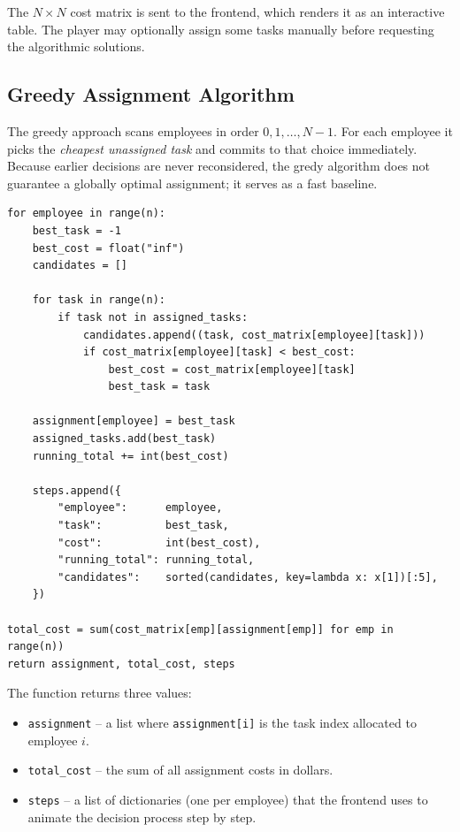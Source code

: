\documentclass[12pt,a4paper]{article}
\begin{document}
\noindent
The $N \times N$ cost matrix is sent to the frontend, which renders it as an
interactive table. The player may optionally assign some tasks manually before
requesting the algorithmic solutions.

\subsection{Greedy Assignment Algorithm}

The greedy approach scans employees in order $0, 1, \ldots, N-1$. For each employee
it picks the \emph{cheapest unassigned task} and commits to that choice immediately.
Because earlier decisions are never reconsidered, the gredy algorithm does not
guarantee a globally optimal assignment; it serves as a fast baseline.

\needspace{14cm}
\begin{lstlisting}[caption={Greedy core loop -- backend/algorithms/greedy.py}]
for employee in range(n):
    best_task = -1
    best_cost = float("inf")
    candidates = []

    for task in range(n):
        if task not in assigned_tasks:
            candidates.append((task, cost_matrix[employee][task]))
            if cost_matrix[employee][task] < best_cost:
                best_cost = cost_matrix[employee][task]
                best_task = task

    assignment[employee] = best_task
    assigned_tasks.add(best_task)
    running_total += int(best_cost)

    steps.append({
        "employee":      employee,
        "task":          best_task,
        "cost":          int(best_cost),
        "running_total": running_total,
        "candidates":    sorted(candidates, key=lambda x: x[1])[:5],
    })

total_cost = sum(cost_matrix[emp][assignment[emp]] for emp in range(n))
return assignment, total_cost, steps
\end{lstlisting}

\noindent
The function returns three values:
\begin{itemize}
    \item \texttt{assignment} -- a list where \texttt{assignment[i]} is the task
          index allocated to employee $i$.
    \item \texttt{total\_cost} -- the sum of all assignment costs in dollars.
    \item \texttt{steps} -- a list of dictionaries (one per employee) that the
          frontend uses to animate the decision process step by step.
\end{itemize}
\end{document}
